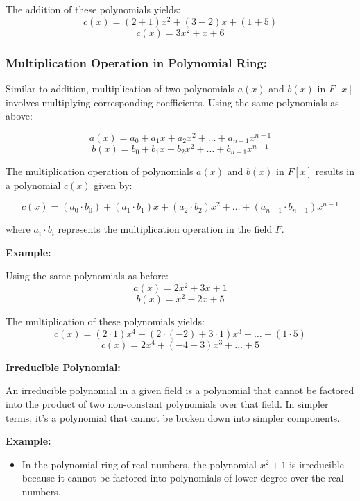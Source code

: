 \documentclass[11pt]{article}
\begin{document}
The addition of these polynomials yields:
\[
c(x) = (2 + 1)x^2 + (3 - 2)x + (1 + 5)
\]
\[
c(x) = 3x^2 + x + 6
\]

\subsubsection{Multiplication Operation in Polynomial Ring:}

Similar to addition, multiplication of two polynomials $a(x)$ and $b(x)$ in $F[x]$ involves multiplying corresponding coefficients. Using the same polynomials as above:

\[
a(x) = a_0 + a_1x + a_2x^2 + \ldots + a_{n-1}x^{n-1}
\]
\[
b(x) = b_0 + b_1x + b_2x^2 + \ldots + b_{n-1}x^{n-1}
\]

The multiplication operation of polynomials $a(x)$ and $b(x)$ in $F[x]$ results in a polynomial $c(x)$ given by:

\[
c(x) = (a_0 \cdot b_0) + (a_1 \cdot b_1)x + (a_2 \cdot b_2)x^2 + \ldots + (a_{n-1} \cdot b_{n-1})x^{n-1}
\]

where $a_i \cdot b_i$ represents the multiplication operation in the field $F$.

\textbf{Example:}

Using the same polynomials as before:
\[
a(x) = 2x^2 + 3x + 1
\]
\[
b(x) = x^2 - 2x + 5
\]

The multiplication of these polynomials yields:
\[
c(x) = (2 \cdot 1)x^4 + (2 \cdot (-2) + 3 \cdot 1)x^3 + \ldots + (1 \cdot 5)
\]
\[
c(x) = 2x^4 + (-4 + 3)x^3 + \ldots + 5
\]


\noindent \textbf{Irreducible Polynomial:}

An irreducible polynomial in a given field is a polynomial that cannot be factored into the product of two non-constant polynomials over that field. In simpler terms, it's a polynomial that cannot be broken down into simpler components.

\vspace{5mm}

\textbf{Example:}
\begin{itemize}
    \item In the polynomial ring of real numbers, the polynomial $x^2 + 1$ is irreducible because it cannot be factored into polynomials of lower degree over the real numbers.
\end{itemize}

\vspace{5mm}
\end{document}
